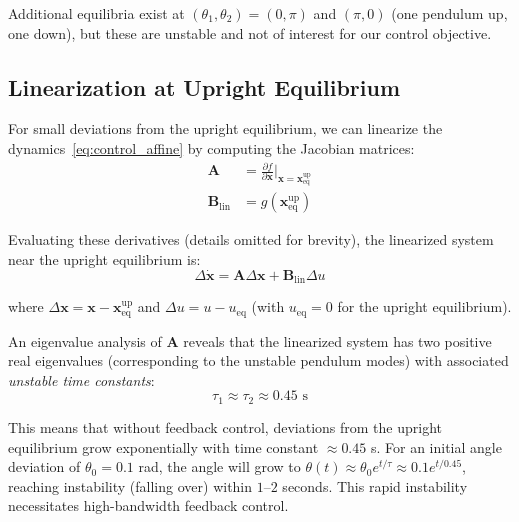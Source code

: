Additional equilibria exist at $(\theta_1, \theta_2) = (0, \pi)$ and $(\pi, 0)$ (one pendulum up, one down), but these are unstable and not of interest for our control objective.

\subsection{Linearization at Upright Equilibrium}

For small deviations from the upright equilibrium, we can linearize the dynamics~\eqref{eq:control_affine} by computing the Jacobian matrices:
\begin{align}
\mathbf{A} &= \frac{\partial f}{\partial \mathbf{x}}\bigg|_{\mathbf{x} = \mathbf{x}_{\text{eq}}^{\text{up}}} \label{eq:jacobian_A} \\
\mathbf{B}_{\text{lin}} &= g(\mathbf{x}_{\text{eq}}^{\text{up}}) \label{eq:jacobian_B}
\end{align}

Evaluating these derivatives (details omitted for brevity), the linearized system near the upright equilibrium is:
\begin{equation}
\Delta\dot{\mathbf{x}} = \mathbf{A} \Delta\mathbf{x} + \mathbf{B}_{\text{lin}} \Delta u
\label{eq:linearized_system}
\end{equation}

where $\Delta\mathbf{x} = \mathbf{x} - \mathbf{x}_{\text{eq}}^{\text{up}}$ and $\Delta u = u - u_{\text{eq}}$ (with $u_{\text{eq}} = 0$ for the upright equilibrium).

An eigenvalue analysis of $\mathbf{A}$ reveals that the linearized system has two positive real eigenvalues (corresponding to the unstable pendulum modes) with associated \textit{unstable time constants}:
\begin{equation}
\tau_1 \approx \tau_2 \approx 0.45 \text{ s}
\label{eq:unstable_time_constants}
\end{equation}

This means that without feedback control, deviations from the upright equilibrium grow exponentially with time constant $\approx 0.45$ s. For an initial angle deviation of $\theta_0 = 0.1$ rad, the angle will grow to $\theta(t) \approx \theta_0 e^{t/\tau} \approx 0.1 e^{t/0.45}$, reaching instability (falling over) within $1$--$2$ seconds. This rapid instability necessitates high-bandwidth feedback control.

